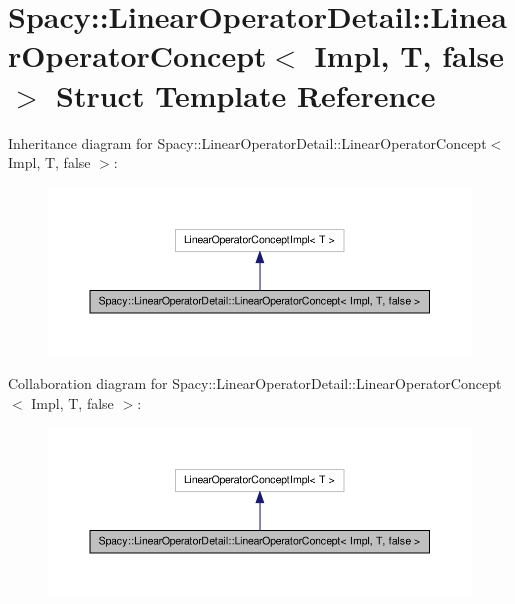 \hypertarget{structSpacy_1_1LinearOperatorDetail_1_1LinearOperatorConcept_3_01Impl_00_01T_00_01false_01_4}{\section{\-Spacy\-:\-:\-Linear\-Operator\-Detail\-:\-:\-Linear\-Operator\-Concept$<$ \-Impl, \-T, false $>$ \-Struct \-Template \-Reference}
\label{structSpacy_1_1LinearOperatorDetail_1_1LinearOperatorConcept_3_01Impl_00_01T_00_01false_01_4}
}


\-Inheritance diagram for \-Spacy\-:\-:\-Linear\-Operator\-Detail\-:\-:\-Linear\-Operator\-Concept$<$ \-Impl, \-T, false $>$\-:
\nopagebreak
\begin{figure}[H]
\begin{center}
\leavevmode
\includegraphics[width=350pt]{structSpacy_1_1LinearOperatorDetail_1_1LinearOperatorConcept_3_01Impl_00_01T_00_01false_01_4__inherit__graph}
\end{center}
\end{figure}


\-Collaboration diagram for \-Spacy\-:\-:\-Linear\-Operator\-Detail\-:\-:\-Linear\-Operator\-Concept$<$ \-Impl, \-T, false $>$\-:
\nopagebreak
\begin{figure}[H]
\begin{center}
\leavevmode
\includegraphics[width=350pt]{structSpacy_1_1LinearOperatorDetail_1_1LinearOperatorConcept_3_01Impl_00_01T_00_01false_01_4__coll__graph}
\end{center}
\end{figure}
